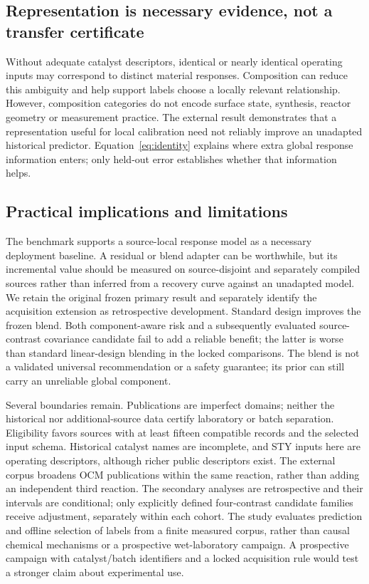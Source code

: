 \documentclass[11pt]{article}
\begin{document}
\subsection{Representation is necessary evidence, not a transfer certificate}
Without adequate catalyst descriptors, identical or nearly identical operating inputs may correspond to distinct material responses. Composition can reduce this ambiguity and help support labels choose a locally relevant relationship. However, composition categories do not encode surface state, synthesis, reactor geometry or measurement practice. The external result demonstrates that a representation useful for local calibration need not reliably improve an unadapted historical predictor. Equation~\ref{eq:identity} explains where extra global response information enters; only held-out error establishes whether that information helps.

\subsection{Practical implications and limitations}
The benchmark supports a source-local response model as a necessary deployment baseline. A residual or blend adapter can be worthwhile, but its incremental value should be measured on source-disjoint and separately compiled sources rather than inferred from a recovery curve against an unadapted model. We retain the original frozen primary result and separately identify the acquisition extension as retrospective development. Standard design improves the frozen blend. Both component-aware risk and a subsequently evaluated source-contrast covariance candidate fail to add a reliable benefit; the latter is worse than standard linear-design blending in the locked comparisons. The blend is not a validated universal recommendation or a safety guarantee; its prior can still carry an unreliable global component.

Several boundaries remain. Publications are imperfect domains; neither the historical nor additional-source data certify laboratory or batch separation. Eligibility favors sources with at least fifteen compatible records and the selected input schema. Historical catalyst names are incomplete, and STY inputs here are operating descriptors, although richer public descriptors exist. The external corpus broadens OCM publications within the same reaction, rather than adding an independent third reaction. The secondary analyses are retrospective and their intervals are conditional; only explicitly defined four-contrast candidate families receive adjustment, separately within each cohort. The study evaluates prediction and offline selection of labels from a finite measured corpus, rather than causal chemical mechanisms or a prospective wet-laboratory campaign. A prospective campaign with catalyst/batch identifiers and a locked acquisition rule would test a stronger claim about experimental use.
\end{document}
